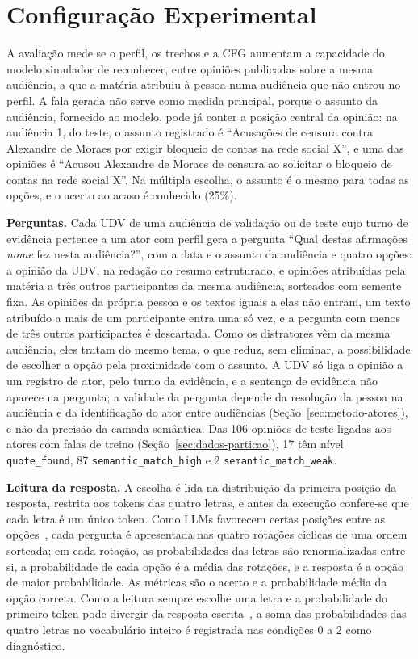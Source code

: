 \section{Configura\c{c}\~ao Experimental}
\label{sec:setup}

A avaliação mede se o perfil, os trechos e a CFG aumentam a capacidade do modelo simulador de
reconhecer, entre opiniões publicadas sobre a mesma audiência, a que a matéria atribuiu à pessoa numa
audiência que não entrou no perfil. A fala gerada não serve como medida principal, porque o assunto
da audiência, fornecido ao modelo, pode já conter a posição central da opinião: na audiência 1, do
teste, o assunto registrado é ``Acusações de censura contra Alexandre de Moraes por exigir bloqueio de
contas na rede social X'', e uma das opiniões é ``Acusou Alexandre de Moraes de censura ao solicitar o
bloqueio de contas na rede social X''. Na múltipla escolha, o assunto é o mesmo para todas as opções,
e o acerto ao acaso é conhecido (25\%).

\textbf{Perguntas.} Cada UDV de uma audiência de validação ou de teste cujo turno de evidência
pertence a um ator com perfil gera a pergunta ``Qual destas afirmações \textit{nome} fez nesta
audiência?'', com a data e o assunto da audiência e quatro opções: a opinião da UDV, na redação do
resumo estruturado, e opiniões atribuídas pela matéria a três outros participantes da mesma
audiência, sorteados com semente fixa. As opiniões da própria pessoa e os textos iguais a elas não
entram, um texto atribuído a mais de um participante entra uma só vez, e a pergunta com menos de três
outros participantes é descartada. Como os distratores vêm da mesma audiência, eles tratam do mesmo
tema, o que reduz, sem eliminar, a possibilidade de escolher a opção pela proximidade com o assunto.
A UDV só liga a opinião a um registro de ator, pelo turno da evidência, e a sentença de evidência não
aparece na pergunta; a validade da pergunta depende da resolução da pessoa na audiência e da
identificação do ator entre audiências (Seção~\ref{sec:metodo-atores}), e não da precisão da camada
semântica. Das 106 opiniões de teste ligadas aos atores com falas de treino
(Seção~\ref{sec:dados-particao}), 17 têm nível \texttt{quote\_found}, 87 \texttt{semantic\_match\_high}
e 2 \texttt{semantic\_match\_weak}.

\textbf{Leitura da resposta.} A escolha é lida na distribuição da primeira posição da resposta,
restrita aos tokens das quatro letras, e antes da execução confere-se que cada letra é um único
token. Como LLMs favorecem certas posições entre as opções~\citep{zheng2024large,pezeshkpour2024large},
cada pergunta é apresentada nas quatro rotações cíclicas de uma ordem sorteada; em cada rotação, as
probabilidades das letras são renormalizadas entre si, a probabilidade de cada opção é a média das
rotações, e a resposta é a opção de maior probabilidade. As métricas são o acerto e a probabilidade
média da opção correta. Como a leitura sempre escolhe uma letra e a probabilidade do primeiro token
pode divergir da resposta escrita~\citep{wang2024answer}, a soma das probabilidades das quatro letras
no vocabulário inteiro é registrada nas condições 0 a 2 como diagnóstico.

